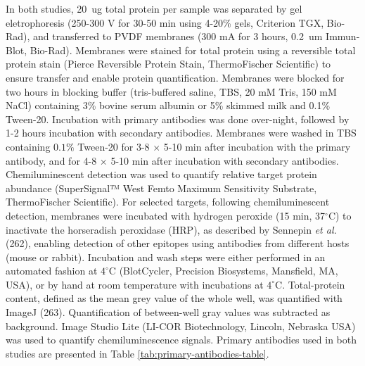 \documentclass[twoside,10pt]{gihclass} %
\begin{document}
In both studies, \SI{20}{ug} total protein per sample was separated by gel eletrophoresis (250-300 V for 30-50 min using 4-20\% gels, Criterion TGX, Bio-Rad), and transferred to PVDF membranes (300 mA for 3 hours, \SI{0.2}{um} Immun-Blot, Bio-Rad).
Membranes were stained for total protein using a reversible total protein stain (Pierce Reversible Protein Stain, ThermoFischer Scientific) to ensure transfer and enable protein quantification.
Membranes were blocked for two hours in blocking buffer (tris-buffered saline, TBS, 20 mM Tris, 150 mM NaCl) containing 3\% bovine serum albumin or 5\% skimmed milk and 0.1\% Tween-20.
Incubation with primary antibodies was done over-night, followed by 1-2 hours incubation with secondary antibodies.
Membranes were washed in TBS containing \(0.1\%\) Tween-20 for 3-8 \(\times\) 5-10 min after incubation with the primary antibody, and for 4-8 \(\times\) 5-10 min after incubation with secondary antibodies.
Chemiluminescent detection was used to quantify relative target protein abundance (SuperSignal™ West Femto Maximum Sensitivity Substrate, ThermoFischer Scientific).
For selected targets, following chemiluminescent detection, membranes were incubated with hydrogen peroxide (15 min, 37\(^{\circ}\)C) to inactivate the horseradish peroxidase (HRP), as described by Sennepin \emph{et al.} (262), enabling detection of other epitopes using antibodies from different hosts (mouse or rabbit).
Incubation and wash steps were either performed in an automated fashion at \(4^{\circ}\)C (BlotCycler, Precision Biosystems, Mansfield, MA, USA), or by hand at room temperature with incubations at \(4^{\circ}\)C.
Total-protein content, defined as the mean grey value of the whole well, was quantified with ImageJ (263). Quantification of between-well gray values was subtracted as background. Image Studio Lite (LI-COR Biotechnology, Lincoln, Nebraska USA) was used to quantify chemiluminescence signals. Primary antibodies used in both studies are presented in Table \ref{tab:primary-antibodies-table}.
\end{document}
